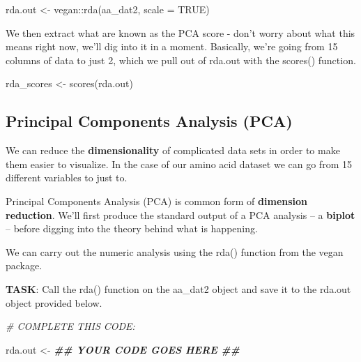 \documentclass[
]{book}
\newenvironment{Shaded}{\begin{snugshade}}{\end{snugshade}}
\newcommand{\AttributeTok}[1]{\textcolor[rgb]{0.77,0.63,0.00}{#1}}
\newcommand{\CommentTok}[1]{\textcolor[rgb]{0.56,0.35,0.01}{\textit{#1}}}
\newcommand{\ConstantTok}[1]{\textcolor[rgb]{0.00,0.00,0.00}{#1}}
\newcommand{\DocumentationTok}[1]{\textcolor[rgb]{0.56,0.35,0.01}{\textbf{\textit{#1}}}}
\newcommand{\FunctionTok}[1]{\textcolor[rgb]{0.00,0.00,0.00}{#1}}
\newcommand{\NormalTok}[1]{#1}
\newcommand{\OtherTok}[1]{\textcolor[rgb]{0.56,0.35,0.01}{#1}}
\newcommand{\SpecialCharTok}[1]{\textcolor[rgb]{0.00,0.00,0.00}{#1}}
\begin{document}
\begin{Shaded}
\begin{Highlighting}[]
\NormalTok{rda.out }\OtherTok{\textless{}{-}}\NormalTok{ vegan}\SpecialCharTok{::}\FunctionTok{rda}\NormalTok{(aa\_dat2, }
                      \AttributeTok{scale =} \ConstantTok{TRUE}\NormalTok{)}
\end{Highlighting}
\end{Shaded}

We then extract what are known as the PCA score - don't worry about what this means right now, we'll dig into it in a moment. Basically, we're going from 15 columns of data to just 2, which we pull out of rda.out with the scores() function.

\begin{Shaded}
\begin{Highlighting}[]
\NormalTok{rda\_scores }\OtherTok{\textless{}{-}} \FunctionTok{scores}\NormalTok{(rda.out)}
\end{Highlighting}
\end{Shaded}

\hypertarget{principal-components-analysis-pca}{%
\subsection{Principal Components Analysis (PCA)}\label{principal-components-analysis-pca}}

We can reduce the \textbf{dimensionality} of complicated data sets in order to make them easier to visualize. In the case of our amino acid dataset we can go from 15 different variables to just to.

Principal Components Analysis (PCA) is common form of \textbf{dimension reduction}. We'll first produce the standard output of a PCA analysis -- a \textbf{biplot} -- before digging into the theory behind what is happening.

We can carry out the numeric analysis using the rda() function from the vegan package.

\textbf{TASK}: Call the rda() function on the aa\_dat2 object and save it to the rda.out object provided below.

\begin{Shaded}
\begin{Highlighting}[]
\CommentTok{\# COMPLETE THIS CODE:}

\NormalTok{rda.out }\OtherTok{\textless{}{-}} \DocumentationTok{\#\# YOUR CODE GOES HERE \#\#}
\end{Highlighting}
\end{Shaded}
\end{document}
